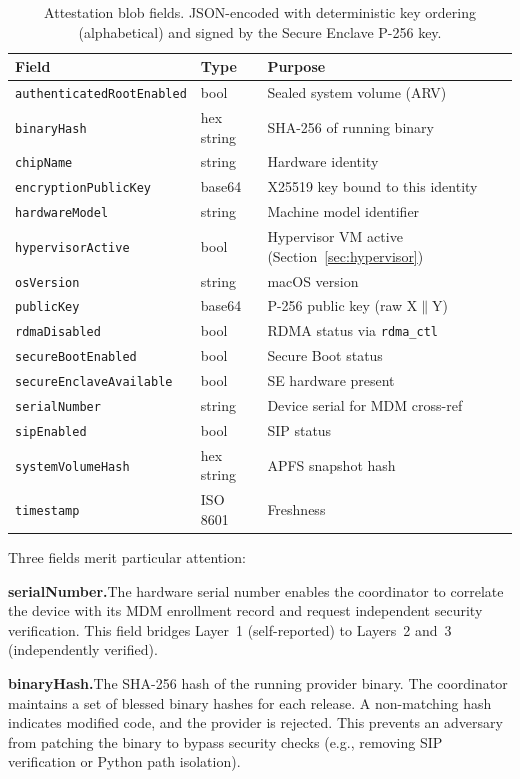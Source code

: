 \documentclass[10pt,twocolumn,letterpaper]{article}
\begin{document}
\begin{table}[h]
\centering
\caption{Attestation blob fields. JSON-encoded with deterministic key ordering (alphabetical) and signed by the Secure Enclave P-256 key.}
\vspace{4pt}
\scriptsize
\begin{tabular}{@{}llp{3.0cm}@{}}
\toprule
\textbf{Field} & \textbf{Type} & \textbf{Purpose} \\
\midrule
\texttt{authenticatedRootEnabled} & bool & Sealed system volume (ARV) \\
\texttt{binaryHash} & hex string & SHA-256 of running binary \\
\texttt{chipName} & string & Hardware identity \\
\texttt{encryptionPublicKey} & base64 & X25519 key bound to this identity \\
\texttt{hardwareModel} & string & Machine model identifier \\
\texttt{hypervisorActive} & bool & Hypervisor VM active (Section~\ref{sec:hypervisor}) \\
\texttt{osVersion} & string & macOS version \\
\texttt{publicKey} & base64 & P-256 public key (raw X$\|$Y) \\
\texttt{rdmaDisabled} & bool & RDMA status via \texttt{rdma\_ctl} \\
\texttt{secureBootEnabled} & bool & Secure Boot status \\
\texttt{secureEnclaveAvailable} & bool & SE hardware present \\
\texttt{serialNumber} & string & Device serial for MDM cross-ref \\
\texttt{sipEnabled} & bool & SIP status \\
\texttt{systemVolumeHash} & hex string & APFS snapshot hash \\
\texttt{timestamp} & ISO 8601 & Freshness \\
\bottomrule
\end{tabular}
\end{table}

Three fields merit particular attention:

\textbf{serialNumber.}\quad The hardware serial number enables the coordinator to correlate the device with its MDM enrollment record and request independent security verification. This field bridges Layer~1 (self-reported) to Layers~2 and~3 (independently verified).

\textbf{binaryHash.}\quad The SHA-256 hash of the running provider binary. The coordinator maintains a set of blessed binary hashes for each release. A non-matching hash indicates modified code, and the provider is rejected. This prevents an adversary from patching the binary to bypass security checks (e.g., removing SIP verification or Python path isolation).
\end{document}
